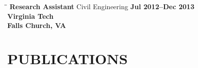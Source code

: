 \documentclass[margin,line]{resume}
\begin{document}
\begin{resume}
        \begin{tabbing}
   \hspace{2.0in}\= \hspace{2.6in}\= \kill %
    {\bf Research Assistant} \> Civil Engineering \> \bf Jul 2012--Dec 2013\\
                          \> {\bf Virginia Tech}\\ \> Falls Church, VA
   \end{tabbing}\vspace{-20pt}



   	    \vspace{-1pt}
   \section{\mysidestyle  \bf  PUBLICATIONS}
   \vspace{-2pt}
   

\end{resume}
\end{document}
